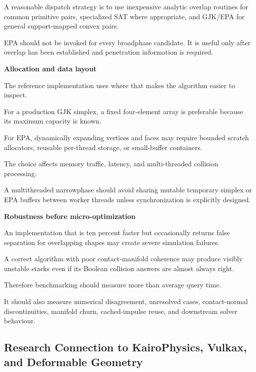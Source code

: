 A reasonable dispatch strategy is to use inexpensive analytic overlap routines for common primitive pairs, specialized SAT where appropriate, and GJK/EPA for general support-mapped convex pairs.

EPA should not be invoked for every broadphase candidate. It is useful only after overlap has been established and penetration information is required.

\textbf{Allocation and data layout}

The reference implementation uses  where that makes the algorithm easier to inspect.

For a production GJK simplex, a fixed four-element array is preferable because its maximum capacity is known.

For EPA, dynamically expanding vertices and faces may require bounded scratch allocators, reusable per-thread storage, or small-buffer containers.

The choice affects memory traffic, latency, and multi-threaded collision processing.

A multithreaded narrowphase should avoid sharing mutable temporary simplex or EPA buffers between worker threads unless synchronization is explicitly designed.

\textbf{Robustness before micro-optimization}

An implementation that is ten percent faster but occasionally returns false separation for overlapping shapes may create severe simulation failures.

A correct algorithm with poor contact-manifold coherence may produce visibly unstable stacks even if its Boolean collision answers are almost always right.

Therefore benchmarking should measure more than average query time.

It should also measure numerical disagreement, unresolved cases, contact-normal discontinuities, manifold churn, cached-impulse reuse, and downstream solver behaviour.

\subsection{Research Connection to KairoPhysics, Vulkax, and Deformable Geometry}\label{04-visual-computing-ii-ch026-research-connection-to-kairophysics-vulkax-and-deformable-geometry}

\hypertarget{04-visual-computing-ii-ch026-research-connection-to-kairophysics-vulkax-and-deformable-geometry}{}

